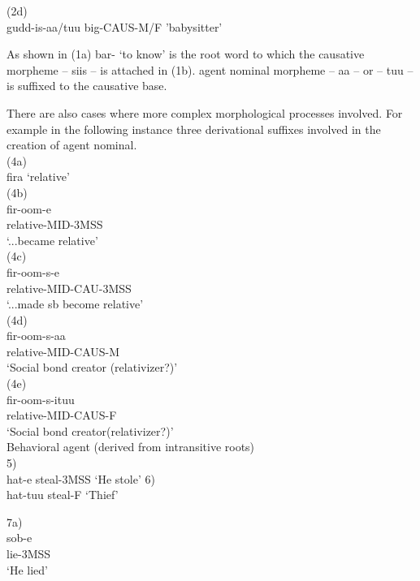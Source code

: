 \documentclass[11pt,a4paper]{article}
\begin{document}
(2d)\\
\indent gudd-is-aa/tuu
\indent big-CAUS-M/F
\indent 'babysitter'

As shown in (1a) bar- ‘to know’ is the root word to which the causative morpheme – siis – is attached in (1b). agent nominal morpheme – aa – or – tuu – is suffixed to the causative base. 

There are also cases where more complex morphological processes involved. For example in the following instance three derivational suffixes involved in the creation of agent nominal.\\

(4a) 	\\
\indent fira ‘relative’\\

(4b) 	\\
\indent fir-oom-e\\
\indent relative-MID-3MSS\\
\indent ‘...became relative’\\

(4c)	\\
\indent fir-oom-s-e\\
\indent relative-MID-CAU-3MSS\\
\indent ‘...made sb become relative’\\

(4d)	\\
\indent fir-oom-s-aa\\
\indent relative-MID-CAUS-M\\
\indent ‘Social bond creator (relativizer?)’\\

(4e)\\
\indent	fir-oom-s-ituu\\
\indent relative-MID-CAUS-F\\
\indent ‘Social bond creator(relativizer?)’\\

Behavioral agent (derived from intransitive roots)\\

5) 	\\
\indent hat-e
\indent steal-3MSS
\indent ‘He stole’
6) 	\\
\indent hat-tuu
\indent steal-F
\indent ‘Thief’

7a) \\
\indent	sob-e\\
\indent lie-3MSS\\
\indent ‘He lied’\\
\end{document}
